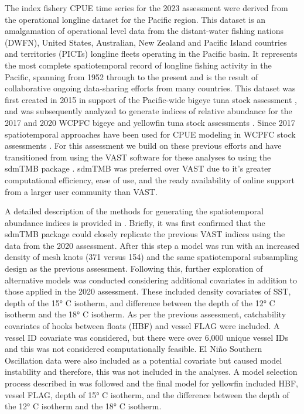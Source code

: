 The index fishery CPUE time series for the 2023 assessment were derived from the operational longline dataset for the Pacific region. This dataset is an amalgamation of operational level data from the distant-water fishing nations (DWFN), United States, Australian, New Zealand and Pacific Island countries and territories (PICTs) longline fleets operating in the Pacific basin. It represents the most complete spatiotemporal record of longline fishing activity in the Pacific, spanning from 1952 through to the present and is the result of collaborative ongoing data-sharing efforts from many countries. This dataset was first created in 2015 in support of the Pacific-wide bigeye tuna stock assessment \citep{mckechnie_analysis_2015}, and was subsequently analyzed to generate indices of relative abundance for the 2017 and 2020 WCPFC bigeye and yellowfin tuna stock assessments \citep{mckechnie_stock_2017,ducharme-barth_analysis_2020}. Since 2017 spatiotemporal approaches have been used for CPUE modeling in WCPFC stock assessments \citep{tremblay-boyer_stock_2017,ducharme-barth_analysis_2020}. For this assessment we build on these previous efforts and have transitioned from using the VAST software \citep{thorson_guidance_2019,thorson_geostatistical_2015} for these analyses to using the sdmTMB package \citep{anderson_sdmtmb_2022}. sdmTMB was preferred over VAST due to it's greater computational efficiency, ease of use, and the ready availability of online support from a larger user community than VAST.

A detailed description of the methods for generating the spatiotemporal abundance indices is provided in \citet{teears_cpue_2023}. Briefly, it was first confirmed that the sdmTMB package could closely replicate the previous VAST indices using the data from the 2020 assessment. After this step a model was run with an increased density of mesh knots (371 versus 154) and the same spatiotemporal subsampling design as the previous assessment. Following this, further exploration of alternative models was conducted considering additional covariates in addition to those applied in the 2020 assessment. These included density covariates of SST, depth of the 15° C isotherm, and difference between the depth of the 12° C isotherm and the 18° C isotherm. As per the previous assessment, catchability covariates of hooks between floats (HBF) and vessel FLAG were included. A vessel ID covariate was considered, but there were over 6,000 unique vessel IDs and this was not considered computationally feasible. El Niño Southern Oscillation data were also included as a potential covariate but caused model instability and therefore, this was not included in the analyses. A model selection process described in \citet{teears_cpue_2023} was followed and the final model for yellowfin included HBF, vessel FLAG, depth of 15° C isotherm, and the difference between the depth of the 12° C  isotherm and the 18° C isotherm.


